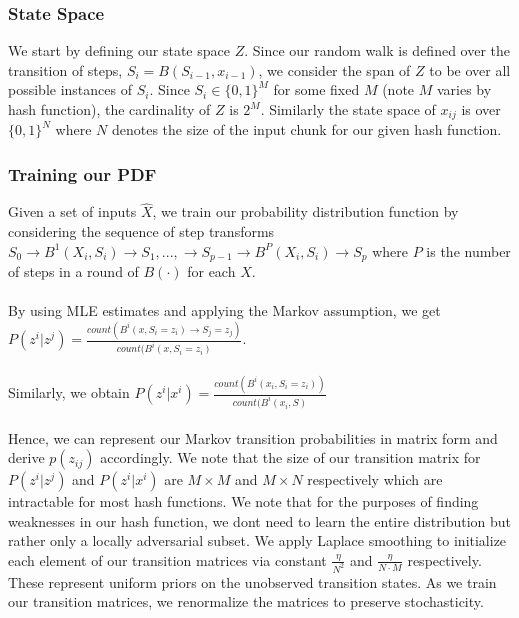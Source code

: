 \documentclass[letterpaper,twocolumn,10pt]{article}
\begin{document}
\subsubsection{State Space}
We start by defining our state space $Z$. Since our random walk is defined over the transition of steps, $S_{i} = B(S_{i-1}, x_{i-1})$, we consider the span of $Z$ to be over all possible instances of $S_{i}$. Since $S_{i} \in \{0, 1\}^{M}$ for some fixed $M$ (note $M$ varies by hash function), the cardinality of $Z$ is $2^{M}$. Similarly the state space of $x_{ij}$ is over $ \{0, 1\}^{N}$ where $N$ denotes the size of the input chunk for our given hash function.


\subsubsection{Training our PDF}
\label{MarkovProcess}
Given a set of inputs $\hat{X}$, we train our probability distribution function by considering the sequence of step transforms $S_{0} \rightarrow B^{1}(X_{i}, S_{i}) \rightarrow S_{1},..., \rightarrow S_{p-1} \rightarrow B^{P}(X_{i}, S_{i}) \rightarrow S_{p}$ where $P$ is the number of steps in a round of $B(\cdot)$ for each $X$. 
\\
\\
By using MLE estimates and applying the Markov assumption, we get $P(z^{i} | z^{j}) = \frac{count(B^{i}(x, S_{i} = z_{i}) \rightarrow S_{j} = z_{j})}{count(B^{i}(x, S_{i} = z_{i})}$. 
\\
\\
Similarly, we obtain $P(z^{i} | x^{i}) = \frac{count(B^{i}(x_{i}, S_{i} = z_{i}))}{count(B^{i}(x_{i}, S)}$
\\
\\
Hence, we can represent our Markov transition probabilities in matrix form and derive $p(z_{ij})$ accordingly. We note that the size of our transition matrix for $P(z^{i} | z^{j})$ and $P(z^{i} | x^{i})$ are $M \times M$ and $M \times N$ respectively which are intractable for most hash functions. We note that for the purposes of finding weaknesses in our hash function, we dont need to learn the entire distribution but rather only a locally adversarial subset. We apply Laplace smoothing to initialize each element of our transition matrices via constant $\frac{\eta}{N^{2}}$ and $\frac{\eta}{N \cdot M}$ respectively. These represent uniform priors on the unobserved transition states. As we train our transition matrices, we renormalize the matrices to preserve stochasticity.
\end{document}
